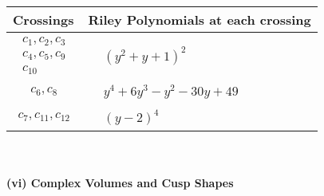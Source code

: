 \documentclass[1p]{elsarticle_modified}
\theoremstyle{definition}
\begin{document}
\begin{tabular}{m{50pt}|m{274pt}}
Crossings & \hspace{64pt}Riley Polynomials at each crossing \\
\hline $$\begin{aligned}c_{1},c_{2},c_{3}\\c_{4},c_{5},c_{9}\\c_{10}\end{aligned}$$&$\begin{aligned}
&(y^2+y+1)^2
\end{aligned}$\\
\hline $$\begin{aligned}c_{6},c_{8}\end{aligned}$$&$\begin{aligned}
&y^4+6 y^3- y^2-30 y+49
\end{aligned}$\\
\hline $$\begin{aligned}c_{7},c_{11},c_{12}\end{aligned}$$&$\begin{aligned}
&(y-2)^4
\end{aligned}$\\
\hline
\end{tabular}\\~\\
\newpage\flushleft \textbf{(vi) Complex Volumes and Cusp Shapes}
\end{document}
